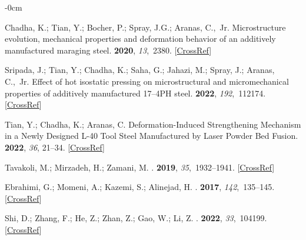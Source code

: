 \documentclass[metals,article,accept,pdftex,moreauthors]{Definitions/mdpi}
\begin{document}
\begin{adjustwidth}{-\extralength}{0cm}
\begin{thebibliography}{999}
Chadha, K.; Tian, Y.; Bocher, P.; Spray, J.G.; Aranas, C.,~Jr.
\newblock Microstructure evolution, mechanical properties and deformation
behavior of an additively manufactured maraging steel.
 {\bf 2020}, {\em 13},~2380. [\href{http://dx.doi.org/10.3390/ma13102380}{CrossRef}]

Sripada, J.; Tian, Y.; Chadha, K.; Saha, G.; Jahazi, M.; Spray, J.; Aranas,
C.,~Jr.
\newblock Effect of hot isostatic pressing on microstructural and
micromechanical properties of additively manufactured 17--4PH steel.
 {\bf 2022}, {\em 192},~112174. [\href{http://dx.doi.org/10.1016/j.matchar.2022.112174}{CrossRef}]

Tian, Y.; Chadha, K.; Aranas, C.
\newblock Deformation-Induced Strengthening Mechanism in a Newly Designed L-40
Tool Steel Manufactured by Laser Powder Bed Fusion.
 {\bf 2022}, {\emph{36}, 21--34}. [\href{http://dx.doi.org/10.1007/s40195-022-01461-z}{CrossRef}]

Tavakoli, M.; Mirzadeh, H.; Zamani, M.
.
 {\bf 2019}, {\em
35},~1932--1941. [\href{http://dx.doi.org/10.1080/02670836.2019.1655862}{CrossRef}]

Ebrahimi, G.; Momeni, A.; Kazemi, S.; Alinejad, H.
.
 {\bf 2017}, {\em 142},~135--145. [\href{http://dx.doi.org/10.1016/j.vacuum.2017.05.010}{CrossRef}]

Shi, D.; Zhang, F.; He, Z.; Zhan, Z.; Gao, W.; Li, Z.
.
 {\bf 2022}, {\em 33},~104199. [\href{http://dx.doi.org/10.1016/j.mtcomm.2022.104199}{CrossRef}]


\end{thebibliography}
\end{adjustwidth}
\end{document}
